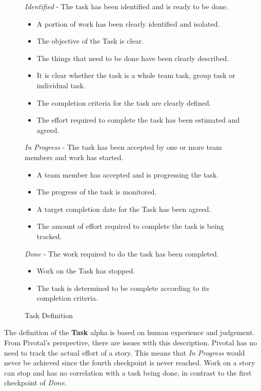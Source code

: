 \documentclass[preprint,12pt,3p]{elsarticle}
\begin{document}
\begin{figure}[h]\vspace*{4pt}
\caption{Task Definition}\vspace*{-6pt}\label{TaskDefinition}
\textit{Identified} - The task has been identified and is ready to be done.
\begin{itemize}
\item A portion of work has been clearly identified and isolated.
\item The objective of the Task is clear.
\item The things that need to be done have been clearly described.
\item It is clear whether the task is a whole team task, group task or individual task.
\item The completion criteria for the task are clearly defined.
\item The effort required to complete the task has been estimated and agreed.
\end{itemize}

\textit{In Progress} - The task has been accepted by one or more team members and work has started.
\begin{itemize}
\item A team member has accepted and is progressing the task.
\item The progress of the task is monitored.
\item A target completion date for the Task has been agreed. 
\item The amount of effort required to complete the task is being tracked.
\end{itemize}

\textit{Done} - The work required to do the task has been completed.
\begin{itemize}
\item Work on the Task has stopped.
\item The task is determined to be complete according to its completion criteria. 
\end{itemize}
\end{figure}

The definition of the \textbf{Task} alpha is based on human experience and judgement. From Pivotal's perspective, there are issues with this description. Pivotal has no need to track the actual effort of a story. This means that \textit{In Progress} would never be achieved since the fourth checkpoint is never reached. Work on a story can stop and has no correlation with a task being done, in contrast to the first checkpoint of \textit{Done}. 
\end{document}
